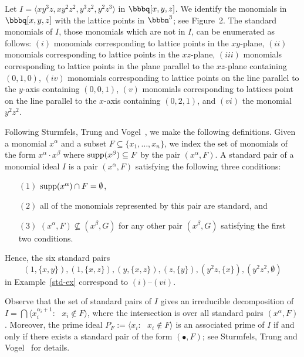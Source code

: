 \begin{example} \label{std-ex} 
Let $I = \langle xy^3z, xy^2z^2, y^3z^2, y^2z^3 \rangle$ in
$\bbbq[x,y,z]$.  We identify the monomials in $\bbbq[x,y,z]$
with the lattice points in $\bbbn^3$; see Figure~2.  The
standard monomials of $I$, those monomials which are not in $I$, can
be enumerated as follows: $(i)$ monomials corresponding to lattice
points in the $xy$-plane, $(ii)$ monomials corresponding to lattice
points in the $xz$-plane, $(iii)$ monomials corresponding to lattice
points in the plane parallel to the $xz$-plane containing $(0,1,0)$,
$(iv)$ monomials corresponding to lattice points on the line parallel
to the $y$-axis containing $(0,0,1)$, $(v)$ monomials corresponding to
lattices point on the line parallel to the $x$-axis containing
$(0,2,1)$, and $(vi)$ the monomial $y^{2}z^{2}$.
\end{example}

Following Sturmfels, Trung and Vogel~\cite{MR96i:13029}, we make the
following definitions.  Given a monomial $x^{\alpha}$ and a subset $F
\subseteq \{ x_{1}, \dotsc, x_{n} \}$, we index the set of monomials
of the form $x^{\alpha} \cdot x^{\beta}$ where $\operatorname{supp}(x^{\beta})
\subseteq F$ by the pair $(x^{\alpha}, F)$.  A standard
pair of a monomial ideal $I$ is a pair
$(x^{\alpha}, F)$ satisfying the following three conditions:
\begin{enumerate}
\item[$(1)$] $\operatorname{supp}(x^{\alpha}) \cap F = \emptyset$,
\item[$(2)$] all of the monomials represented by this pair are
standard, and
\item[$(3)$] $(x^{\alpha}, F) \not\subseteq (x^{\beta}, G)$ for any
other pair $(x^{\beta}, G)$ satisfying the first two conditions.
\end{enumerate}
Hence, the six standard pairs 
\[ 
(1, \{x,y\}), (1, \{x,z\}), (y,\{x,z\}), (z, \{y\}), (y^{2}z, \{x\}),
(y^2z^2, \emptyset)
\]
in Example~\ref{std-ex} correspond to $(i)$--$(vi)$.

Observe that the set of standard pairs of $I$ gives an irreducible
decomposition of $I = \bigcap \langle
x_{i}^{\alpha_{i}+1} : \text{ $x_{i} \notin F$} \rangle$, where the
intersection is over all standard pairs $(x^{\alpha}, F)$.  Moreover,
the prime ideal $P_F := \langle x_{i} : \text{ $x_{i} \notin F$}
\rangle$ is an associated prime of $I$ if and only if there exists a
standard pair of the form $(\bullet, F)$; see Sturmfels, Trung and
Vogel~\cite{MR96i:13029} for details.


